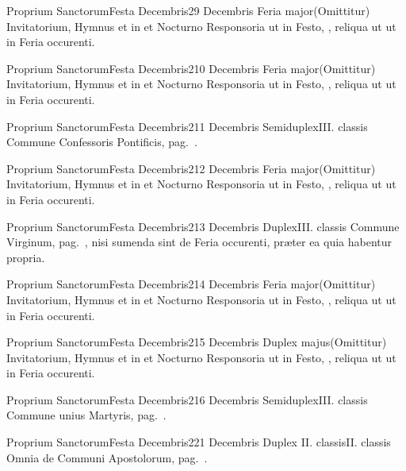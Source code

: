 \documentclass[nocturnale-romanum.tex]{subfiles}
\begin{document}
	{Proprium Sanctorum}{Festa Decembris}{2}{9 Decembris}
	{Feria major}{(Omittitur)}
	{Invitatorium, Hymnus et in  et  Nocturno Responsoria ut in Festo, \pageref{M-1208}, reliqua ut ut in Feria occurenti.}
	{}

	{Proprium Sanctorum}{Festa Decembris}{2}{10 Decembris}
	{Feria major}{(Omittitur)}
	{Invitatorium, Hymnus et in  et  Nocturno Responsoria ut in Festo, \pageref{M-1208}, reliqua ut ut in Feria occurenti.}
	{}

	{Proprium Sanctorum}{Festa Decembris}{2}{11 Decembris}
	{Semiduplex}{III. classis}
	{Commune Confessoris Pontificis, pag.\ \pageref{M-COPO}.}
	{}

	{Proprium Sanctorum}{Festa Decembris}{2}{12 Decembris}
	{Feria major}{(Omittitur)}
	{Invitatorium, Hymnus et in  et  Nocturno Responsoria ut in Festo, \pageref{M-1208}, reliqua ut ut in Feria occurenti.}
	{}

	{Proprium Sanctorum}{Festa Decembris}{2}{13 Decembris}
	{Duplex}{III. classis}
	{Commune Virginum, pag.\ \pageref{M-MU}, nisi sumenda sint de Feria occurenti, præter ea quia habentur propria.}
	{}

	{Proprium Sanctorum}{Festa Decembris}{2}{14 Decembris}
	{Feria major}{(Omittitur)}
	{Invitatorium, Hymnus et in  et  Nocturno Responsoria ut in Festo, \pageref{M-1208}, reliqua ut ut in Feria occurenti.}
	{}

	{Proprium Sanctorum}{Festa Decembris}{2}{15 Decembris}
	{Duplex majus}{(Omittitur)}
	{Invitatorium, Hymnus et in  et  Nocturno Responsoria ut in Festo, \pageref{M-1208}, reliqua ut ut in Feria occurenti.}
	{}

	{Proprium Sanctorum}{Festa Decembris}{2}{16 Decembris}
	{Semiduplex}{III. classis}
	{Commune unius Martyris, pag.\ \pageref{M-UMEX}.}
	{}

	{Proprium Sanctorum}{Festa Decembris}{2}{21 Decembris}
	{Duplex II. classis}{II. classis}
	{Omnia de Communi Apostolorum, pag.\ \pageref{M-APEX}.}
	{}
	
\end{document}
